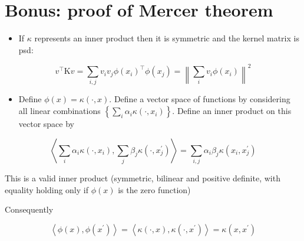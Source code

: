\documentclass[10pt]{article}
\begin{document}
\section*{Bonus: proof of Mercer theorem}
\begin{itemize}
  \item If $\kappa$ represents an inner product then it is symmetric and the kernel matrix is psd:
\end{itemize}

$$
v^{\top} \mathrm{K} v=\sum_{i, j} v_{i} v_{j} \phi\left(x_{i}\right)^{\top} \phi\left(x_{j}\right)=\left\|\sum_{i} v_{i} \phi\left(x_{i}\right)\right\|^{2}
$$

\begin{itemize}
  \item Define $\phi(x)=\kappa(\cdot, x)$. Define a vector space of functions by considering all linear combinations $\left\{\sum_{i} \alpha_{i} \kappa\left(\cdot, x_{i}\right)\right\}$. Define an inner product on this vector space by
\end{itemize}

$$
\left\langle\sum_{i} \alpha_{i} \kappa\left(\cdot, x_{i}\right), \sum_{j} \beta_{j} \kappa\left(\cdot, x_{j}^{\prime}\right)\right\rangle=\sum_{i, j} \alpha_{i} \beta_{j} \kappa\left(x_{i}, x_{j}^{\prime}\right)
$$

This is a valid inner product (symmetric, bilinear and positive definite, with equality holding only if $\phi(x)$ is the zero function)

Consequently

$$
\left\langle\phi(x), \phi\left(x^{\prime}\right)\right\rangle=\left\langle\kappa(\cdot, x), \kappa\left(\cdot, x^{\prime}\right)\right\rangle=\kappa\left(x, x^{\prime}\right)
$$
\end{document}
